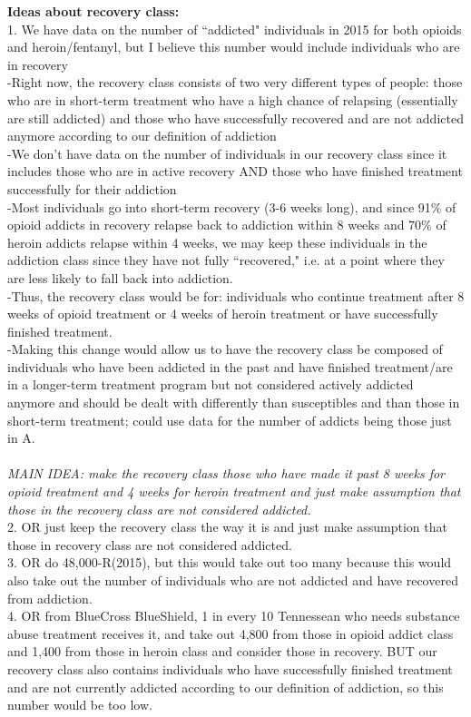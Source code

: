 \documentclass[12pt]{article}
\begin{document}
\noindent \textbf{Ideas about recovery class:} \\ 

1.  \noindent We have data on the number of ``addicted" individuals in 2015 for both opioids and heroin/fentanyl, but I believe this number would include individuals who are in recovery \\
-Right now, the recovery class consists of two very different types of people: those who are in short-term treatment who have a high chance of relapsing (essentially are still addicted) and those who have successfully recovered and are not addicted anymore according to our definition of addiction \\
-We don't have data on the number of individuals in our recovery class since it includes those who are in active recovery AND those who have finished treatment successfully for their addiction \\
-Most individuals go into short-term recovery (3-6 weeks long), and since 91\% of opioid addicts in recovery relapse back to addiction within 8 weeks and 70\% of heroin addicts relapse within 4 weeks, we may keep these individuals in the addiction class since they have not fully ``recovered," i.e. at a point where they are less likely to fall back into addiction. \\
-Thus, the recovery class would be for: individuals who continue treatment after 8 weeks of opioid treatment or 4 weeks of heroin treatment or have successfully finished treatment. \\
-Making this change would allow us to have the recovery class be composed of individuals who have been addicted in the past and have finished treatment/are in a longer-term treatment program but not considered actively addicted anymore and should be dealt with differently than susceptibles and than those in short-term treatment; could use data for the number of addicts being those just in A. \\ \\
\textit{MAIN IDEA: make the recovery class those who have made it past 8 weeks for opioid treatment and 4 weeks for heroin treatment and just make assumption that those in the recovery class are not considered addicted.}\\

2. \noindent OR just keep the recovery class the way it is and just make assumption that those in recovery class are not considered addicted. \\

3. \noindent OR do 48,000-R(2015), but this would take out too many because this would also take out the number of individuals who are not addicted and have recovered from addiction. \\

4. \noindent OR from BlueCross BlueShield, 1 in every 10 Tennessean who needs substance abuse treatment receives it, and take out 4,800 from those in opioid addict class and 1,400 from those in heroin class and consider those in recovery. BUT our recovery class also contains individuals who have successfully finished treatment and are not currently addicted according to our definition of addiction, so this number would be too low.   \\ %
\end{document}
